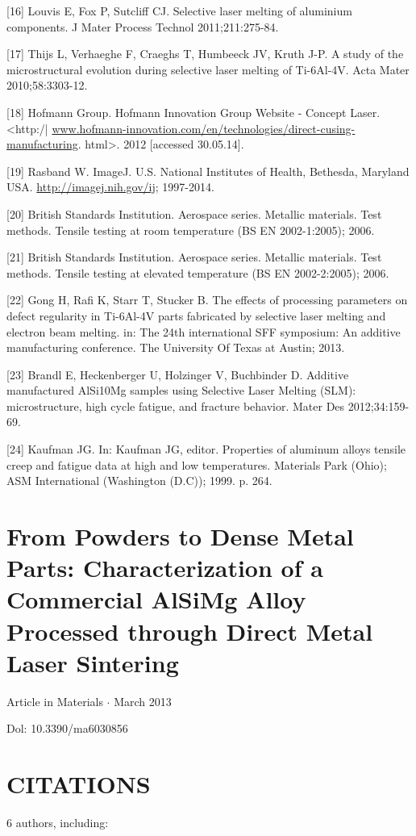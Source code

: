 \documentclass[10pt]{article}
\begin{document}
[16] Louvis E, Fox P, Sutcliff CJ. Selective laser melting of aluminium components. J Mater Process Technol 2011;211:275-84.

[17] Thijs L, Verhaeghe F, Craeghs T, Humbeeck JV, Kruth J-P. A study of the microstructural evolution during selective laser melting of Ti-6Al-4V. Acta Mater 2010;58:3303-12.

[18] Hofmann Group. Hofmann Innovation Group Website - Concept Laser. <http:/| \href{http://www.hofmann-innovation.com/en/technologies/direct-cusing-manufacturing}{www.hofmann-innovation.com/en/technologies/direct-cusing-manufacturing}. html>. 2012 [accessed 30.05.14].

[19] Rasband W. ImageJ. U.S. National Institutes of Health, Bethesda, Maryland USA. \href{http://imagej.nih.gov/ij}{http://imagej.nih.gov/ij}; 1997-2014.

[20] British Standards Institution. Aerospace series. Metallic materials. Test methods. Tensile testing at room temperature (BS EN 2002-1:2005); 2006.

[21] British Standards Institution. Aerospace series. Metallic materials. Test methods. Tensile testing at elevated temperature (BS EN 2002-2:2005); 2006.

[22] Gong H, Rafi K, Starr T, Stucker B. The effects of processing parameters on defect regularity in Ti-6Al-4V parts fabricated by selective laser melting and electron beam melting. in: The 24th international SFF symposium: An additive manufacturing conference. The University Of Texas at Austin; 2013.

[23] Brandl E, Heckenberger U, Holzinger V, Buchbinder D. Additive manufactured AlSi10Mg samples using Selective Laser Melting (SLM): microstructure, high cycle fatigue, and fracture behavior. Mater Des 2012;34:159-69.

[24] Kaufman JG. In: Kaufman JG, editor. Properties of aluminum alloys tensile creep and fatigue data at high and low temperatures. Materials Park (Ohio); ASM International (Washington (D.C)); 1999. p. 264.

\section*{From Powders to Dense Metal Parts: Characterization of a Commercial AlSiMg Alloy Processed through Direct Metal Laser Sintering}
Article in Materials $\cdot$ March 2013

Dol: 10.3390/ma6030856

\section*{CITATIONS}
6 authors, including:
\end{document}
